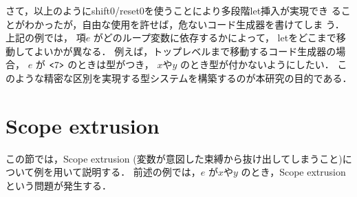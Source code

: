 %
%
%
%
%

さて，以上のようにshift0/reset0を使うことにより多段階let挿入が実現でき
ることがわかったが，自由な使用を許せば，危ないコード生成器を書けてしま
う．上記の例では，
項$e$ がどのループ変数に依存するかによって，
letをどこまで移動してよいかが異なる．
例えば，トップレベルまで移動するコード生成器の場合，
$e$ が $\texttt{<}{7}\texttt{>}$ のときは型がつき，
$x$や$y$ のとき型が付かないようにしたい．
このような精密な区別を実現する型システムを構築するのが本研究の目的である．

\section{Scope extrusion}
この節では，Scope extrusion (変数が意図した束縛から抜け出してしまうこと)について例を用いて説明する．
前述の例では，$e$ が$x$や$y$ のとき，Scope extrusion という問題が発生する．

